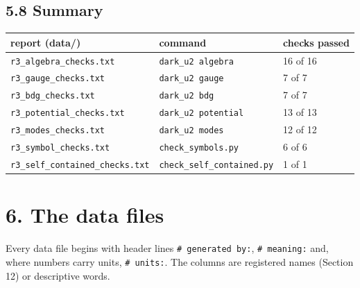 \documentclass[
  10pt,
]{article}
\begin{document}
\hypertarget{summary}{%
\subsection{5.8 Summary}\label{summary}}

\begin{longtable}[]{@{}lll@{}}
\toprule\noalign{}
report (data/) & command & checks passed \\
\midrule\noalign{}
\endhead
\bottomrule\noalign{}
\endlastfoot
\texttt{r3\_algebra\_checks.txt} & \texttt{dark\_u2\ algebra} & 16 of
16 \\
\texttt{r3\_gauge\_checks.txt} & \texttt{dark\_u2\ gauge} & 7 of 7 \\
\texttt{r3\_bdg\_checks.txt} & \texttt{dark\_u2\ bdg} & 7 of 7 \\
\texttt{r3\_potential\_checks.txt} & \texttt{dark\_u2\ potential} & 13
of 13 \\
\texttt{r3\_modes\_checks.txt} & \texttt{dark\_u2\ modes} & 12 of 12 \\
\texttt{r3\_symbol\_checks.txt} & \texttt{check\_symbols.py} & 6 of 6 \\
\texttt{r3\_self\_contained\_checks.txt} &
\texttt{check\_self\_contained.py} & 1 of 1 \\
\end{longtable}

\hypertarget{the-data-files}{%
\section{6. The data files}\label{the-data-files}}

Every data file begins with header lines \texttt{\#\ generated\ by:},
\texttt{\#\ meaning:} and, where numbers carry units,
\texttt{\#\ units:}. The columns are registered names (Section 12) or
descriptive words.
\end{document}
